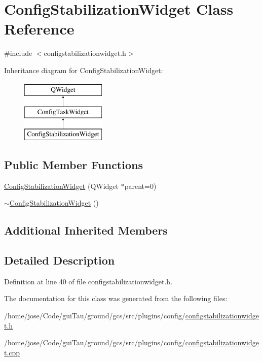 \hypertarget{class_config_stabilization_widget}{\section{Config\-Stabilization\-Widget Class Reference}
\label{class_config_stabilization_widget}
}


{\ttfamily \#include $<$configstabilizationwidget.\-h$>$}

Inheritance diagram for Config\-Stabilization\-Widget\-:\begin{figure}[H]
\begin{center}
\leavevmode
\includegraphics[height=3.000000cm]{class_config_stabilization_widget}
\end{center}
\end{figure}
\subsection*{Public Member Functions}
\begin{DoxyCompactItemize}
\item 
\hyperlink{group___config_plugin_ga7ede076de26384e87d8b8357b391c0b6}{Config\-Stabilization\-Widget} (Q\-Widget $\ast$parent=0)
\item 
\hyperlink{group___config_plugin_gaeca64ce80c3529dc40b452e3bcef2ffd}{$\sim$\-Config\-Stabilization\-Widget} ()
\end{DoxyCompactItemize}
\subsection*{Additional Inherited Members}


\subsection{Detailed Description}


Definition at line 40 of file configstabilizationwidget.\-h.



The documentation for this class was generated from the following files\-:\begin{DoxyCompactItemize}
\item 
/home/jose/\-Code/gui\-Tau/ground/gcs/src/plugins/config/\hyperlink{configstabilizationwidget_8h}{configstabilizationwidget.\-h}\item 
/home/jose/\-Code/gui\-Tau/ground/gcs/src/plugins/config/\hyperlink{configstabilizationwidget_8cpp}{configstabilizationwidget.\-cpp}\end{DoxyCompactItemize}
